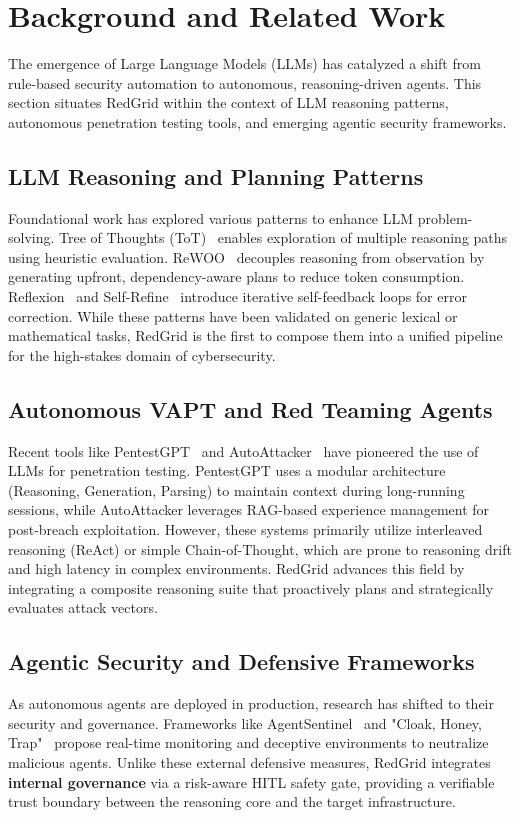 \section{Background and Related Work}

The emergence of Large Language Models (LLMs) has catalyzed a shift from rule-based security automation to autonomous, reasoning-driven agents. This section situates RedGrid within the context of LLM reasoning patterns, autonomous penetration testing tools, and emerging agentic security frameworks.

\subsection{LLM Reasoning and Planning Patterns}
Foundational work has explored various patterns to enhance LLM problem-solving. Tree of Thoughts (ToT)~\cite{tot} enables exploration of multiple reasoning paths using heuristic evaluation. ReWOO~\cite{rewoo} decouples reasoning from observation by generating upfront, dependency-aware plans to reduce token consumption. Reflexion~\cite{reflexion} and Self-Refine~\cite{selfrefine} introduce iterative self-feedback loops for error correction. While these patterns have been validated on generic lexical or mathematical tasks, RedGrid is the first to compose them into a unified pipeline for the high-stakes domain of cybersecurity.

\subsection{Autonomous VAPT and Red Teaming Agents}
Recent tools like PentestGPT~\cite{pentestgpt} and AutoAttacker~\cite{autoattacker} have pioneered the use of LLMs for penetration testing. PentestGPT uses a modular architecture (Reasoning, Generation, Parsing) to maintain context during long-running sessions, while AutoAttacker leverages RAG-based experience management for post-breach exploitation. However, these systems primarily utilize interleaved reasoning (ReAct) or simple Chain-of-Thought, which are prone to reasoning drift and high latency in complex environments. RedGrid advances this field by integrating a composite reasoning suite that proactively plans and strategically evaluates attack vectors.

\subsection{Agentic Security and Defensive Frameworks}
As autonomous agents are deployed in production, research has shifted to their security and governance. Frameworks like AgentSentinel~\cite{agentsentinel} and "Cloak, Honey, Trap"~\cite{cloak} propose real-time monitoring and deceptive environments to neutralize malicious agents. Unlike these external defensive measures, RedGrid integrates \textbf{internal governance} via a risk-aware HITL safety gate, providing a verifiable trust boundary between the reasoning core and the target infrastructure.


